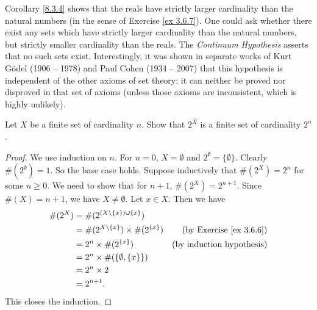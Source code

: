 \setcounter{theorem}{5}
\begin{remark}\label{8.3.6}
    Corollary \ref{8.3.4} shows that the reals have strictly larger cardinality than the natural numbers (in the sense of Exercise \ref{ex 3.6.7}).
    One could ask whether there exist any sets which have strictly larger cardinality than the natural numbers, but strictly smaller cardinality than the reals.
    The \emph{Continuum Hypothesis} asserts that no such sets exist.
    Interestingly, it was shown in separate works of Kurt Gödel (1906 -- 1978) and Paul Cohen (1934 -- 2007) that this hypothesis is independent of the other axioms of set theory;
    it can neither be proved nor disproved in that set of axioms
    (unless those axioms are inconsistent, which is highly unlikely).
\end{remark}

\exercisesection

\begin{exercise}\label{ex 8.3.1}
    Let \(X\) be a finite set of cardinality \(n\).
    Show that \(2^X\) is a finite set of cardinality \(2^n\).
\end{exercise}

\begin{proof}
    We use induction on \(n\).
    For \(n = 0\), \(X = \emptyset\) and \(2^{\emptyset} = \{\emptyset\}\).
    Clearly \(\#(2^{\emptyset}) = 1\).
    So the base case holds.
    Suppose inductively that \(\#(2^X) = 2^n\) for some \(n \geq 0\).
    We need to show that for \(n + 1\), \(\#(2^X) = 2^{n + 1}\).
    Since \(\#(X) = n + 1\), we have \(X \neq \emptyset\).
    Let \(x \in X\).
    Then we have
    \begin{align*}
        \#(2^X) & = \#(2^{(X \setminus \{x\}) \cup \{x\}})                                               \\
                & = \#(2^{X \setminus \{x\}}) \times \#(2^{\{x\}}) & \text{(by Exercise \ref{ex 3.6.6})} \\
                & = 2^n \times \#(2^{\{x\}})                       & \text{(by induction hypothesis)}    \\
                & = 2^n \times \#(\{\emptyset, \{x\}\})                                                  \\
                & = 2^n \times 2                                                                         \\
                & = 2^{n + 1}.
    \end{align*}
    This closes the induction.
\end{proof}

